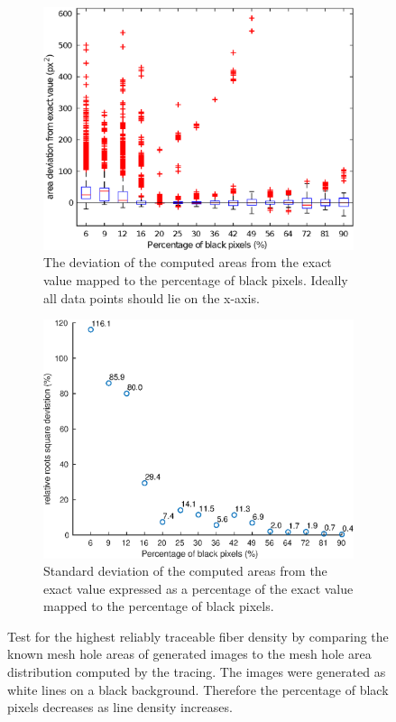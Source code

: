 \documentclass[12pt,english,twocolumn]{revtex4}
\begin{document}
\begin{figure}[h!]
	\begin{subfigure}[b]{\linewidth}
		\includegraphics[width=\linewidth]{illustrations/line_density_new_1.eps}
		\caption{The deviation of the computed areas from the exact value mapped to the percentage of black pixels. Ideally all data points should lie on the x-axis.}
		\label{subfig:dev_boxplot}
	\end{subfigure}
	\begin{subfigure}[b]{\linewidth}
		\includegraphics[width=\linewidth]{illustrations/line_density_new_2.eps}
		\caption{Standard deviation of the computed areas from the exact value expressed as a percentage of the exact value mapped to the percentage of black pixels.}
		\label{subfig:dev_percent}
	\end{subfigure}
	\caption{Test for the highest reliably traceable fiber density by comparing the known mesh hole areas of generated images to the mesh hole area distribution computed by the tracing. The images were generated as white lines on a black background. Therefore the percentage of black pixels decreases as line density increases.}
	\label{fig:dev_linedense}
\end{figure}
\end{document}
